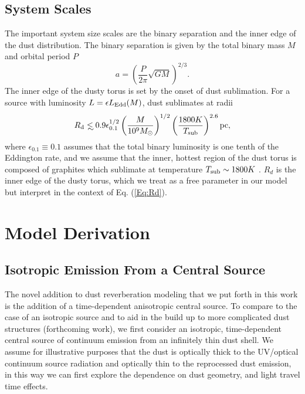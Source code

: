 \subsection{System Scales} 
The important system size scales are the binary separation and the inner edge of the
dust distribution. The binary separation is given by the total binary mass $M$
and orbital period $P$
\begin{equation}
a = \left(\frac{P}{2 \pi} \sqrt{GM} \right)^{2/3}.
\label{Eq:Bsep}
\end{equation}
The inner edge of the dusty torus is set by the onset of dust sublimation. 
For a source with luminosity $L = \epsilon L_{\rm{Edd}}(M)$, dust sublimates at radii
\begin{equation}
\Rin \lsim 0.9 \epsilon^{1/2}_{0.1} \left(\frac{M}{10^9 \Msun }\right)^{1/2}  \left(\frac{1800 K}{ T_{\rm{sub}} }\right)^{2.6} \rm{pc},
\label{Eq:Rd}
\end{equation}
where $\epsilon_{0.1} \equiv 0.1$ assumes that the total binary luminosity is
one tenth of the Eddington rate, and we assume that the inner, hottest region
of the dust torus is composed of graphites which sublimate at temperature
$T_{\rm{sub}} \sim 1800 K$ \citep{MorTrakhtenbrot:2011, MorNetzer:2012}. $R_d$
is the inner edge of the dusty torus, which we treat as a free parameter in
our model but interpret in the context of Eq. (\ref{Eq:Rd}). 




\section{Model Derivation}
\label{S:Derivation}
\subsection{Isotropic Emission From a Central Source}
\label{S:FISOderivation}

The novel addition to dust reverberation modeling that we put forth in this
work is the addition of a time-dependent anisotropic central source. To
compare to the case of an isotropic source and to aid in the build up to 
more complicated dust structures (forthcoming work), we first consider
an isotropic, time-dependent central source of continuum emission from an
infinitely thin dust shell. We assume for illustrative purposes that the dust
is optically thick to the UV/optical continuum source radiation and optically
thin to the reprocessed dust emission, in this way we can first explore the
dependence on dust geometry, and light travel time effects.

